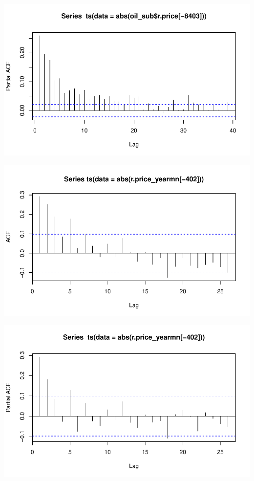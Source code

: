 \documentclass[11pt]{article}\usepackage[]{graphicx}\usepackage[]{color}
\makeatletter
\def\maxwidth{ %
  \ifdim\Gin@nat@width>\linewidth
    \linewidth
  \else
    \Gin@nat@width
  \fi
}
\newenvironment{knitrout}{}{} %
\makeatother
\begin{document}
\begin{knitrout}
{}




{\centering \includegraphics[width=\maxwidth]{figure/abs_plots-4} 

}




{\centering \includegraphics[width=\maxwidth]{figure/abs_plots-5} 

}




{\centering \includegraphics[width=\maxwidth]{figure/abs_plots-6} 

}
\end{knitrout}
\end{document}

